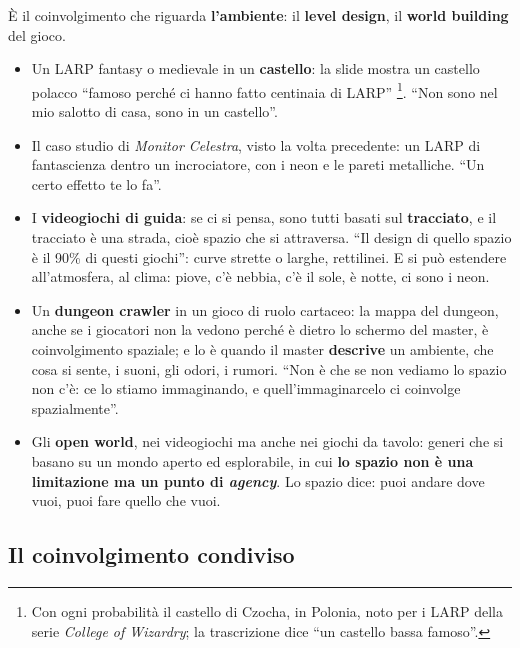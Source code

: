 

È il coinvolgimento che riguarda \textbf{l'ambiente}: il \textbf{level design}, il
\textbf{world building} del gioco.
\begin{itemize}
  \item Un LARP fantasy o medievale in un \textbf{castello}: la slide mostra un
        castello polacco ``famoso perché ci hanno fatto centinaia di LARP''
        \footnote{Con ogni probabilità il castello di Czocha, in Polonia, noto
        per i LARP della serie \emph{College of Wizardry}; la trascrizione dice
        ``un castello bassa famoso''.}. ``Non sono nel mio salotto di casa, sono
        in un castello''.
  \item Il caso studio di \emph{Monitor Celestra}, visto la volta precedente:
        un LARP di fantascienza dentro un incrociatore, con i neon e le pareti
        metalliche. ``Un certo effetto te lo fa''.
  \item I \textbf{videogiochi di guida}: se ci si pensa, sono tutti basati sul
        \textbf{tracciato}, e il tracciato è una strada, cioè spazio che si
        attraversa. ``Il design di quello spazio è il 90\% di questi giochi'':
        curve strette o larghe, rettilinei. E si può estendere all'atmosfera,
        al clima: piove, c'è nebbia, c'è il sole, è notte, ci sono i neon.
  \item Un \textbf{dungeon crawler} in un gioco di ruolo cartaceo: la mappa del
        dungeon, anche se i giocatori non la vedono perché è dietro lo schermo
        del master, è coinvolgimento spaziale; e lo è quando il master
        \textbf{descrive} un ambiente, che cosa si sente, i suoni, gli odori, i
        rumori. ``Non è che se non vediamo lo spazio non c'è: ce lo stiamo
        immaginando, e quell'immaginarcelo ci coinvolge spazialmente''.
  \item Gli \textbf{open world}, nei videogiochi ma anche nei giochi da tavolo:
        generi che si basano su un mondo aperto ed esplorabile, in cui
        \textbf{lo spazio non è una limitazione ma un punto di \emph{agency}}.
        Lo spazio dice: puoi andare dove vuoi, puoi fare quello che vuoi.
\end{itemize}

\subsection{Il coinvolgimento condiviso}

